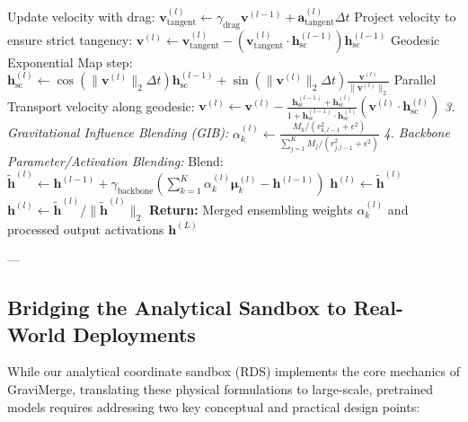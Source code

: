 \begin{algorithm}[H]
\begin{algorithmic}[1]
    \STATE Update velocity with drag: $\mathbf{v}_{\text{tangent}}^{(l)} \leftarrow \gamma_{\text{drag}} \mathbf{v}^{(l-1)} + \mathbf{a}_{\text{tangent}}^{(l)} \Delta t$
    \STATE Project velocity to ensure strict tangency: $\mathbf{v}^{(l)} \leftarrow \mathbf{v}_{\text{tangent}}^{(l)} - \left( \mathbf{v}_{\text{tangent}}^{(l)} \cdot \mathbf{h}_{\text{sc}}^{(l-1)} \right) \mathbf{h}_{\text{sc}}^{(l-1)}$
    \STATE Geodesic Exponential Map step: $\mathbf{h}_{\text{sc}}^{(l)} \leftarrow \cos\left(\|\mathbf{v}^{(l)}\|_2 \Delta t\right) \mathbf{h}_{\text{sc}}^{(l-1)} + \sin\left(\|\mathbf{v}^{(l)}\|_2 \Delta t\right) \frac{\mathbf{v}^{(l)}}{\|\mathbf{v}^{(l)}\|_2}$
    \STATE Parallel Transport velocity along geodesic: $\mathbf{v}^{(l)} \leftarrow \mathbf{v}^{(l)} - \frac{\mathbf{h}_{\text{sc}}^{(l-1)} + \mathbf{h}_{\text{sc}}^{(l)}}{1 + \mathbf{h}_{\text{sc}}^{(l-1)} \cdot \mathbf{h}_{\text{sc}}^{(l)}} \left( \mathbf{v}^{(l)} \cdot \mathbf{h}_{\text{sc}}^{(l)} \right)$
    \STATE \textit{3. Gravitational Influence Blending (GIB):}
        \STATE $\alpha_k^{(l)} \leftarrow \frac{M_k / (r_{k, l-1}^2 + \epsilon^2)}{\sum_{j=1}^K M_j / (r_{j, l-1}^2 + \epsilon^2)}$
    \ENDFOR
    \STATE \textit{4. Backbone Parameter/Activation Blending:}
    \STATE Blend: $\tilde{\mathbf{h}}^{(l)} \leftarrow \mathbf{h}^{(l-1)} + \gamma_{\text{backbone}} \left( \sum_{k=1}^K \alpha_k^{(l)} \boldsymbol{\mu}_k^{(l)} - \mathbf{h}^{(l-1)} \right)$
        \STATE $\mathbf{h}^{(l)} \leftarrow \tilde{\mathbf{h}}^{(l)}$ 
    \ELSE
        \STATE $\mathbf{h}^{(l)} \leftarrow \tilde{\mathbf{h}}^{(l)} / \|\tilde{\mathbf{h}}^{(l)}\|_2$
    \ENDIF
\ENDFOR
\STATE \textbf{Return:} Merged ensembling weights $\alpha_k^{(l)}$ and processed output activations $\mathbf{h}^{(L)}$
\end{algorithmic}
\end{algorithm}

---

\subsection{Bridging the Analytical Sandbox to Real-World Deployments}
\label{sec:appendix_sandbox_bridge}
While our analytical coordinate sandbox (RDS) implements the core mechanics of GraviMerge, translating these physical formulations to large-scale, pretrained models requires addressing two key conceptual and practical design points:

